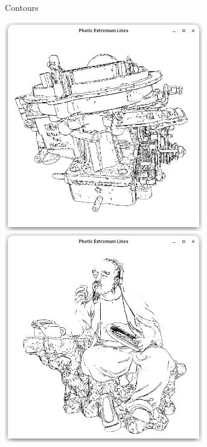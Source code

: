 \documentclass[9pt,fleqn,twoside,twocolumn]{stdglobal}
\begin{document}
\begin{figure}
\begin{subfigure}[t]{0.19\textwidth}
        \caption{Contours}
      \end{subfigure}%
      \hfill%
      \begin{subfigure}[t]{0.19\textwidth}
        \centering
        \includegraphics[width=0.95\textwidth,trim={15px 15 15 50},clip]{images/results/carburetor-pel.png}
        \includegraphics[width=0.95\textwidth,trim={15px 15 15 50},clip]{images/results/luyu-pel.png}

\end{subfigure}
\end{figure}
\end{document}

